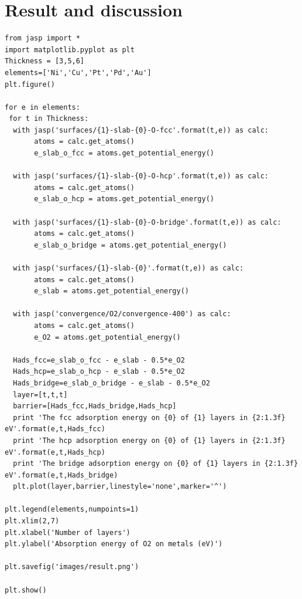 \documentclass[11pt]{article}
\begin{document}
\section{Result and discussion}
\label{sec-4}


\begin{verbatim}
from jasp import *
import matplotlib.pyplot as plt
Thickness = [3,5,6]
elements=['Ni','Cu','Pt','Pd','Au']
plt.figure()

for e in elements:
 for t in Thickness:
  with jasp('surfaces/{1}-slab-{0}-O-fcc'.format(t,e)) as calc:
       atoms = calc.get_atoms()
       e_slab_o_fcc = atoms.get_potential_energy()

  with jasp('surfaces/{1}-slab-{0}-O-hcp'.format(t,e)) as calc:
       atoms = calc.get_atoms()
       e_slab_o_hcp = atoms.get_potential_energy()

  with jasp('surfaces/{1}-slab-{0}-O-bridge'.format(t,e)) as calc:
       atoms = calc.get_atoms()
       e_slab_o_bridge = atoms.get_potential_energy()

  with jasp('surfaces/{1}-slab-{0}'.format(t,e)) as calc:
       atoms = calc.get_atoms()
       e_slab = atoms.get_potential_energy()

  with jasp('convergence/O2/convergence-400') as calc:
       atoms = calc.get_atoms()
       e_O2 = atoms.get_potential_energy()

  Hads_fcc=e_slab_o_fcc - e_slab - 0.5*e_O2
  Hads_hcp=e_slab_o_hcp - e_slab - 0.5*e_O2
  Hads_bridge=e_slab_o_bridge - e_slab - 0.5*e_O2
  layer=[t,t,t]
  barrier=[Hads_fcc,Hads_bridge,Hads_hcp]
  print 'The fcc adsorption energy on {0} of {1} layers in {2:1.3f} eV'.format(e,t,Hads_fcc)
  print 'The hcp adsorption energy on {0} of {1} layers in {2:1.3f} eV'.format(e,t,Hads_hcp)
  print 'The bridge adsorption energy on {0} of {1} layers in {2:1.3f} eV'.format(e,t,Hads_bridge)
  plt.plot(layer,barrier,linestyle='none',marker='^')

plt.legend(elements,numpoints=1)
plt.xlim(2,7)
plt.xlabel('Number of layers')
plt.ylabel('Absorption energy of O2 on metals (eV)')

plt.savefig('images/result.png')

plt.show()
\end{verbatim}
\end{document}
